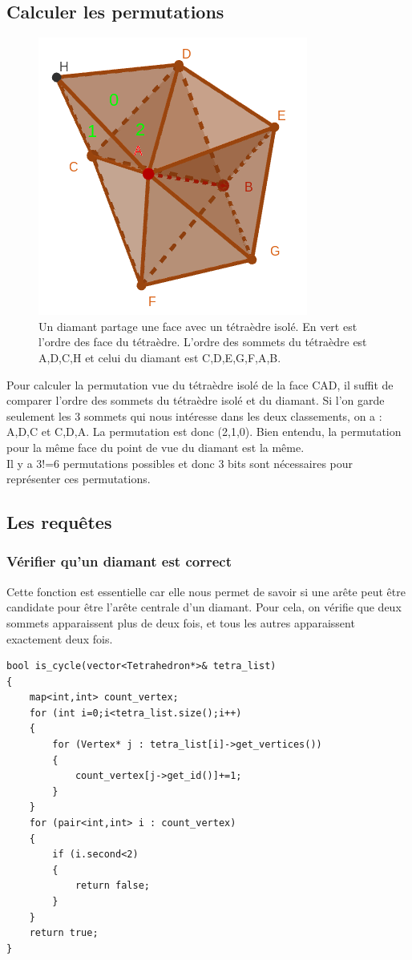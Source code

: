 \documentclass[a4paper,11pt,openany]{article}
\begin{document}
\subsection{Calculer les permutations}
\noindent
\begin{figure}[H]
\begin{center}
\includegraphics[scale=0.45]{Images/permutation_tetra_diamant}
\caption{Un diamant partage une face avec un tétraèdre isolé. En vert est l'ordre des face du tétraèdre. L'ordre des sommets du tétraèdre est A,D,C,H et celui du diamant est C,D,E,G,F,A,B.}
\label{fig:permutation_tetra_diamant}
\end{center}
\end{figure}
\noindent
Pour calculer la permutation vue du tétraèdre isolé de la face CAD, il suffit de comparer l'ordre des sommets du tétraèdre isolé et du diamant. Si l'on garde seulement les 3 sommets qui nous intéresse dans les deux classements, on a : A,D,C et C,D,A. La permutation est donc (2,1,0). Bien entendu, la permutation pour la même face du point de vue du diamant est la même.\\
Il y a 3!=6 permutations possibles et donc 3 bits sont nécessaires pour représenter ces permutations.
\subsection{Les requêtes}
\subsubsection{Vérifier qu'un diamant est correct}
\noindent
Cette fonction est essentielle car elle nous permet de savoir si une arête peut être candidate pour être l'arête centrale d'un diamant. Pour cela, on vérifie que deux sommets apparaissent plus de deux fois, et tous les autres apparaissent exactement deux fois.
\begin{lstlisting}
bool is_cycle(vector<Tetrahedron*>& tetra_list)
{
    map<int,int> count_vertex;
    for (int i=0;i<tetra_list.size();i++)
    {
        for (Vertex* j : tetra_list[i]->get_vertices())
        {
            count_vertex[j->get_id()]+=1;
        }
    }
    for (pair<int,int> i : count_vertex)
    {
        if (i.second<2)
        {
            return false;
        }
    }
    return true;
}
\end{lstlisting}
\end{document}
